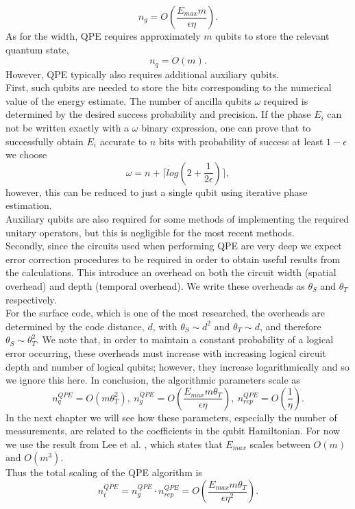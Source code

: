 \begin{equation}
    n_g = O\left(\frac{E_{max} m}{\epsilon \eta}\right).
\end{equation}
As for the width, QPE requires approximately $m$ qubits to store the relevant quantum state,
\begin{equation}
    n_q = O(m).
\end{equation}
However, QPE typically also requires additional auxiliary qubits. \\
First, such qubits are needed to store the bits corresponding to the numerical value of the energy estimate. The number of ancilla qubits $\omega$ required is determined by the desired success probability and precision. If the phase $E_i$ can not be written exactly with a $\omega$ binary expression, one can prove that to successfully obtain $E_i$ accurate to $n$ bits with probability of success at least $1 - \epsilon$ we choose \cite{Nielsen2010Dec}
\begin{equation}
    \omega = n + \biggl\lceil log \left( 2 + \frac{1}{2\epsilon} \right) \biggr\rceil,
\end{equation}
however, this can be reduced to just a single qubit using iterative phase estimation. \\
Auxiliary qubits are also required for some methods of implementing the required unitary operators, but this is negligible for the most recent methods. \\
Secondly, since the circuits used when performing QPE are very deep we expect error correction procedures to be required in order to obtain useful results from the calculations. This introduce an overhead on both the circuit width (spatial overhead) and depth (temporal overhead). We write these overheads as $\theta_S$ and $\theta_T$ respectively. \\
For the surface code, which is one of the most researched, the overheads are determined by the code distance, $d$, with $\theta_S \sim d^2$ and $\theta_T \sim d$, and therefore $\theta_S \sim \theta_T^2$. We note that, in order to maintain a constant probability of a logical error occurring, these overheads must increase with increasing logical circuit depth and number of logical qubits; however, they increase logarithmically and so we ignore this here.
In conclusion, the algorithmic parameters scale as \cite{Blunt2022Jun}
\begin{equation}
    n_q^{QPE} = O(m \theta_T^2), \ n_g^{QPE} = O\left( \frac{E_{max} m \theta_T}{\epsilon \eta} \right), \ n_{rep}^{QPE} = O\left( \frac{1}{\eta} \right). \label{Scaling QPE}
\end{equation}
In the next chapter we will see how these parameters, especially the number of measurements, are related to the coefficients in the qubit Hamiltonian. For now we use the result from Lee et al. \cite{Lee2020Nov}, which states that $E_{max}$ scales between $O(m)$ and $O(m^3)$. \\
Thus the total scaling of the QPE algorithm is
\begin{equation}
    n_t^{QPE} = n_g^{QPE} \cdot n_{rep}^{QPE} = O\left( \frac{E_{max} m \theta_T}{\epsilon \eta^2} \right). \label{Scaling QPE 1}
\end{equation}

